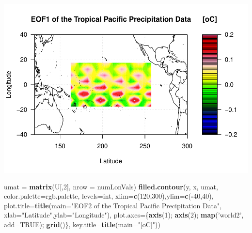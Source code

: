 \documentclass[
]{article}
\newenvironment{Shaded}{\begin{snugshade}}{\end{snugshade}}
\newcommand{\DataTypeTok}[1]{\textcolor[rgb]{0.13,0.29,0.53}{#1}}
\newcommand{\DecValTok}[1]{\textcolor[rgb]{0.00,0.00,0.81}{#1}}
\newcommand{\KeywordTok}[1]{\textcolor[rgb]{0.13,0.29,0.53}{\textbf{#1}}}
\newcommand{\NormalTok}[1]{#1}
\newcommand{\OperatorTok}[1]{\textcolor[rgb]{0.81,0.36,0.00}{\textbf{#1}}}
\newcommand{\OtherTok}[1]{\textcolor[rgb]{0.56,0.35,0.01}{#1}}
\newcommand{\StringTok}[1]{\textcolor[rgb]{0.31,0.60,0.02}{#1}}
\begin{document}
\includegraphics{Assignment3_files/figure-latex/unnamed-chunk-2-1.pdf}

\begin{Shaded}
\begin{Highlighting}[]
\NormalTok{umat =}\StringTok{ }\KeywordTok{matrix}\NormalTok{(U[,}\DecValTok{2}\NormalTok{], }\DataTypeTok{nrow =}\NormalTok{ numLonVals)}
\KeywordTok{filled.contour}\NormalTok{(y, x, umat, }\DataTypeTok{color.palette=}\NormalTok{rgb.palette, }\DataTypeTok{levels=}\NormalTok{int,}
               \DataTypeTok{xlim=}\KeywordTok{c}\NormalTok{(}\DecValTok{120}\NormalTok{,}\DecValTok{300}\NormalTok{),}\DataTypeTok{ylim=}\KeywordTok{c}\NormalTok{(}\OperatorTok{-}\DecValTok{40}\NormalTok{,}\DecValTok{40}\NormalTok{),}
               \DataTypeTok{plot.title=}\KeywordTok{title}\NormalTok{(}\DataTypeTok{main=}\StringTok{"EOF2 of the Tropical Pacific Precipitation Data"}\NormalTok{,}
                                \DataTypeTok{xlab=}\StringTok{"Latitude"}\NormalTok{,}\DataTypeTok{ylab=}\StringTok{"Longitude"}\NormalTok{),}
               \DataTypeTok{plot.axes=}\NormalTok{\{}\KeywordTok{axis}\NormalTok{(}\DecValTok{1}\NormalTok{); }\KeywordTok{axis}\NormalTok{(}\DecValTok{2}\NormalTok{); }\KeywordTok{map}\NormalTok{(}\StringTok{'world2'}\NormalTok{, }\DataTypeTok{add=}\OtherTok{TRUE}\NormalTok{); }\KeywordTok{grid}\NormalTok{()\},}
               \DataTypeTok{key.title=}\KeywordTok{title}\NormalTok{(}\DataTypeTok{main=}\StringTok{"[oC]"}\NormalTok{))}
\end{Highlighting}
\end{Shaded}
\end{document}
